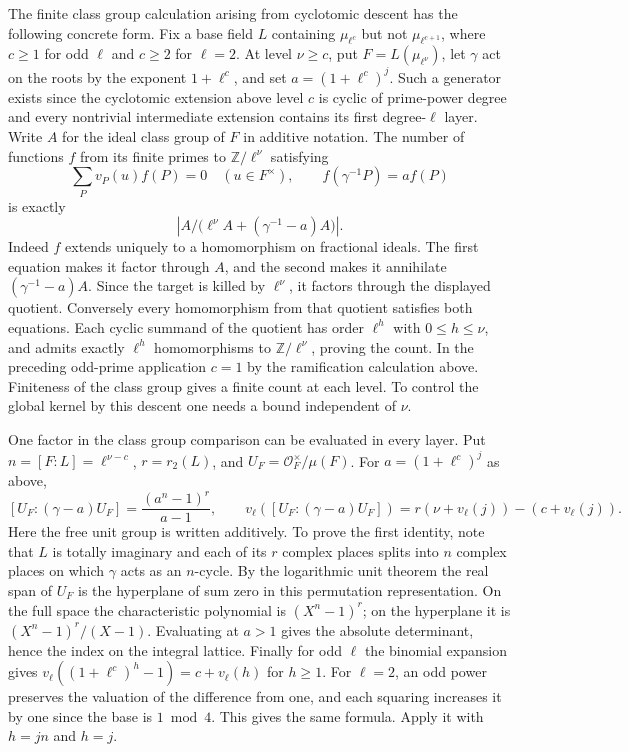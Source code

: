 \documentclass[11pt]{amsart}
\theoremstyle{definition}
\theoremstyle{remark}
\begin{document}
The finite class group calculation arising from cyclotomic descent
has the following concrete form. Fix a base field $L$ containing
$\mu_{\ell^c}$ but not $\mu_{\ell^{c+1}}$, where $c\ge1$ for odd $\ell$ and $c\ge2$ for $\ell=2$.
At level $\nu\ge c$, put $F=L(\mu_{\ell^\nu})$, let $\gamma$ act
on the roots by the exponent $1+\ell^c$, and set $a=(1+\ell^c)^j$.
Such a generator exists since the cyclotomic extension above level $c$
is cyclic of prime-power degree and every nontrivial intermediate
extension contains its first degree-$\ell$ layer. Write $A$ for the
ideal class group of $F$ in additive notation. The number of functions
$f$ from its finite primes to $\mathbb Z/\ell^\nu$ satisfying
\[
 \sum_P v_P(u)f(P)=0\quad(u\in F^\times),\qquad
 f(\gamma^{-1}P)=a f(P)
\]
is exactly
\[
 \left|A\big/\big(\ell^\nu A+(\gamma^{-1}-a)A\big)\right|.
\]
Indeed $f$ extends uniquely to a homomorphism on fractional ideals.
The first equation makes it factor through $A$, and the second makes
it annihilate $(\gamma^{-1}-a)A$. Since the target is killed by
$\ell^\nu$, it factors through the displayed quotient. Conversely
every homomorphism from that quotient satisfies both equations.
Each cyclic summand of the quotient has order $\ell^h$ with
$0\le h\le\nu$, and admits exactly $\ell^h$ homomorphisms to
$\mathbb Z/\ell^\nu$, proving the count. In the preceding odd-prime application
$c=1$ by the ramification calculation above. Finiteness of the class
group gives a finite count at each level. To control the global kernel
by this descent one needs a bound independent of $\nu$.

One factor in the class group comparison can be evaluated in every
layer. Put $n=[F:L]=\ell^{\nu-c}$, $r=r_2(L)$, and
$U_F=\mathcal O_F^\times/\mu(F)$. For $a=(1+\ell^c)^j$ as above,
\[
 [U_F:(\gamma-a)U_F]=\frac{(a^n-1)^r}{a-1},
 \qquad
 v_\ell([U_F:(\gamma-a)U_F])
 =r(\nu+v_\ell(j))-(c+v_\ell(j)).
\]
Here the free unit group is written additively. To prove the first
identity, note that $L$ is totally imaginary and each of its $r$
complex places splits into $n$ complex places on which $\gamma$ acts
as an $n$-cycle. By the logarithmic unit theorem the real span of
$U_F$ is the hyperplane of sum zero in this permutation representation.
On the full space the characteristic polynomial is $(X^n-1)^r$;
on the hyperplane it is $(X^n-1)^r/(X-1)$. Evaluating at $a>1$
gives the absolute determinant, hence the index on the integral
lattice. Finally for odd $\ell$ the binomial expansion gives
$v_\ell((1+\ell^c)^h-1)=c+v_\ell(h)$ for $h\ge1$.
For $\ell=2$, an odd power preserves the valuation of the difference from one, and each squaring increases it by one since the base is $1\bmod4$. This gives the same formula. Apply it with $h=jn$ and $h=j$.
\end{document}
